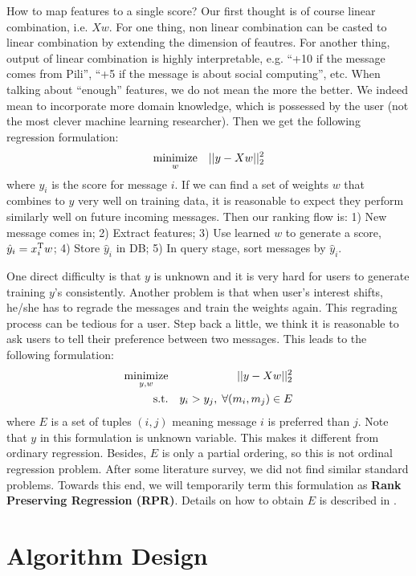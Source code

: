 \documentclass{sig-alternate}
\begin{document}
How to map features to a single score? 
Our first thought is of course linear combination, i.e. $Xw$. 
For one thing, non linear combination can be casted 
to linear combination by extending the dimension of feautres. 
For another thing, output of linear combination is highly interpretable, 
e.g. ``+10 if the message comes from Pili'', 
``+5 if the message is about social computing'', etc. 
When talking about ``enough'' features, 
we do not mean the more the better. 
We indeed mean to incorporate more domain knowledge, 
which is possessed by the user
(not the most clever machine learning researcher). 
Then we get the following regression formulation:
\begin{eqnarray}
	\operatorname*{minimize}_{w} && ||y - Xw||_2^2 
\end{eqnarray}
where $y_i$ is the score for message $i$. 
If we can find a set of weights $w$ that combines to $y$
very well on training data, 
it is reasonable to expect they perform similarly well 
on future incoming messages. 
Then our ranking flow is:
1) New message comes in; 
2) Extract features;
3) Use learned $w$ to generate a score, $\hat{y}_i = x_i^\mathrm{T} w$;
4) Store $\hat{y}_i$ in DB; 
5) In query stage, sort messages by $\hat{y}_i$.

One direct difficulty is that $y$ is unknown and 
it is very hard for users to generate training $y$'s consistently. 
Another problem is that when user's interest shifts, 
he/she has to regrade the messages and train the weights again. 
This regrading process can be tedious for a user. 
Step back a little, we think it is reasonable to ask users to
tell their preference between two messages. 
This leads to the following formulation:
\begin{eqnarray}
	\operatorname*{minimize}_{y,w} && ||y - Xw||_2^2 \\
	\text{s.t.} && y_i > y_j, \; \forall (m_i,m_j) \in E
\end{eqnarray}
where $E$ is a set of tuples $(i,j)$ meaning message $i$ is preferred than $j$. 
Note that $y$ in this formulation is unknown variable. 
This makes it different from ordinary regression. 
Besides, $E$ is only a partial ordering, so this is not ordinal regression problem. 
After some literature survey, we did not find similar standard problems. 
Towards this end, we will temporarily term this formulation as 
{\bf Rank Preserving Regression (RPR)}.  
Details on how to obtain $E$ is described in 
\rsec{\ref{sec:Induce Preference Relations on Graph}}. 

\section{Algorithm Design}
\label{sec:Algorithm Design}
\end{document}
